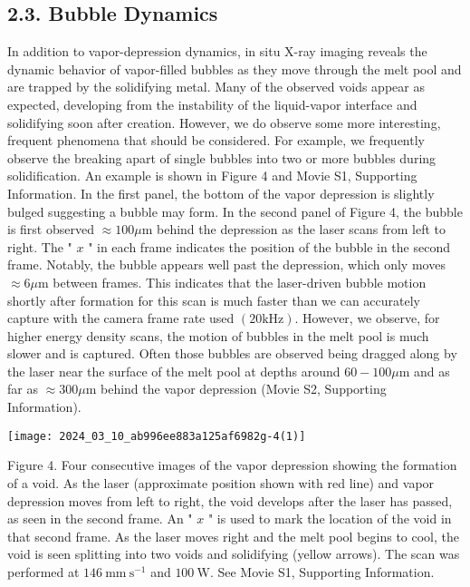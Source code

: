 \documentclass[10pt]{article}
\begin{document}
\subsection*{2.3. Bubble Dynamics}
In addition to vapor-depression dynamics, in situ X-ray imaging reveals the dynamic behavior of vapor-filled bubbles as they move through the melt pool and are trapped by the solidifying metal. Many of the observed voids appear as expected, developing from the instability of the liquid-vapor interface and solidifying soon after creation. However, we do observe some more interesting, frequent phenomena that should be considered. For example, we frequently observe the breaking apart of single bubbles into two or more bubbles during solidification. An example is shown in Figure 4 and Movie S1, Supporting Information. In the first panel, the bottom of the vapor depression is slightly bulged suggesting a bubble may form. In the second panel of Figure 4, the bubble is first observed $\approx 100 \mu \mathrm{m}$ behind the depression as the laser scans from left to right. The " $x$ " in each frame indicates the position of the bubble in the second frame. Notably, the bubble appears well past the depression, which only moves $\approx 6 \mu \mathrm{m}$ between frames. This indicates that the laser-driven bubble motion shortly after formation for this scan is much faster than we can accurately capture with the camera frame rate used $(20 \mathrm{kHz})$. However, we observe, for higher energy density scans, the motion of bubbles in the melt pool is much slower and is captured. Often those bubbles are observed being dragged along by the laser near the surface of the melt pool at depths around $60-100 \mu \mathrm{m}$ and as far as $\approx 300 \mu \mathrm{m}$ behind the vapor depression (Movie S2, Supporting Information).

\begin{center}
\texttt{[image: 2024\_03\_10\_ab996ee883a125af6982g-4(1)]}
\end{center}

Figure 4. Four consecutive images of the vapor depression showing the formation of a void. As the laser (approximate position shown with red line) and vapor depression moves from left to right, the void develops after the laser has passed, as seen in the second frame. An " $x$ " is used to mark the location of the void in that second frame. As the laser moves right and the melt pool begins to cool, the void is seen splitting into two voids and solidifying (yellow arrows). The scan was performed at $146 \mathrm{~mm} \mathrm{~s}^{-1}$ and $100 \mathrm{~W}$. See Movie S1, Supporting Information.
\end{document}
